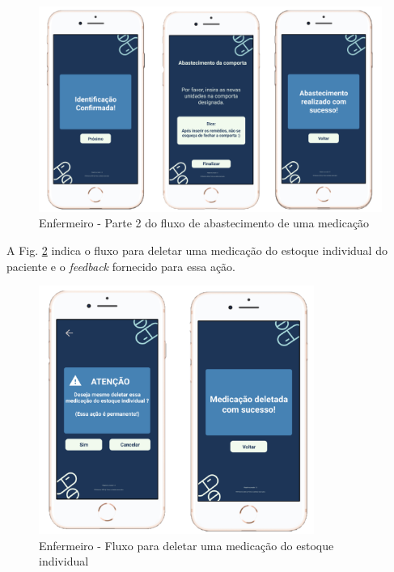 \begin{figure}[H]
    \centering
    \includegraphics[width=13cm]{figuras/software/Atual_prototipo/Enfermeiro_abastecer_4.png}
    \caption{Enfermeiro - Parte 2 do fluxo de abastecimento de uma medicação}
    \label{fig:prototipo_enfermeiro_abastecer_4}
\end{figure}

A Fig. \ref{fig:prototipo_enfermeiro_abastecer_5} indica o fluxo para deletar uma medicação do estoque individual do paciente e o \textit{feedback} fornecido para essa ação.

\begin{figure}[H]
    \centering
    \includegraphics[width=9cm]{figuras/software/Atual_prototipo/Enfermeiro_abastecer_5.png}
    \caption{Enfermeiro - Fluxo para deletar uma medicação do estoque individual}
    \label{fig:prototipo_enfermeiro_abastecer_5}
\end{figure}

